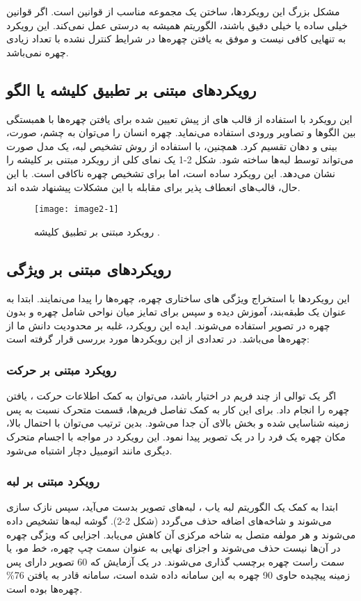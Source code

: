 مشکل بزرگ این رویکرد‌ها، ساختن یک مجموعه مناسب از قوانین است. اگر قوانین خیلی ساده یا خیلی دقیق باشند، الگوریتم همیشه به درستی عمل نمی‌کند. این رویکرد به تنهایی کافی نیست و موفق به یافتن چهره‌ها در شرایط کنترل نشده با تعداد زیادی چهره نمی‌باشد.

\subsection{رویکردهای مبتنی بر تطبیق کلیشه یا الگو}
این رویکرد با استفاده از قالب  ‌های از پیش تعیین شده برای یافتن چهره‌ها با همبستگی بین الگوها و تصاویر ورودی استفاده می‌نماید. چهره انسان را می‌توان به چشم، صورت، بینی و دهان تقسیم کرد. همچنین، با استفاده از روش تشخیص لبه، یک مدل صورت می‌تواند توسط لبه‌ها ساخته شود. شکل 2-1 یک نمای کلی از رویکرد مبتنی بر کلیشه را نشان می‌دهد. این رویکرد ساده است، اما برای تشخیص چهره ناکافی است. با این حال، قالب‌های انعطاف پذیر برای مقابله با این مشکلات پیشنهاد شده اند.


\begin{figure}[h]
\centering
  \texttt{[image: image2-1]}
  \caption{رویکرد مبتنی بر تطبیق کلیشه  \cite{ref1}.}
  \label{image2-1}
\end{figure}

\subsection{رویکردهای مبتنی بر ویژگی}
این رویکردها‌ با استخراج ویژگی  ‌های ساختاری چهره، چهره‌ها را پیدا می‌نمایند. ابتدا به عنوان یک طبقه‌بند، آموزش دیده و سپس برای تمایز میان نواحی شامل چهره و بدون چهره در تصویر استفاده می‌شوند. ایده این رویکرد، غلبه بر محدودیت دانش ما از چهره‌ها می‌باشد. در \cite{HJELMAS2001236} تعدادی از این رویکردها مورد بررسی قرار گرفته است:

\subsubsection{رویکرد مبتنی بر حرکت}
اگر یک توالی از چند فریم در اختیار باشد، می‌توان به کمک اطلاعات حرکت ، یافتن چهره را انجام داد. برای این کار به کمک تفاصل فریم‌ها، قسمت متحرک نسبت به پس زمینه شناسایی شده و بخش بالای آن جدا می‌شود. بدین ترتیب می‌توان با احتمال بالا، مکان چهره یک فرد را در یک تصویر پیدا نمود. این رویکرد در مواجه با اجسام متحرک دیگری مانند اتومبیل دچار اشتباه می‌شود.

\subsubsection{رویکرد مبتنی بر لبه}
ابتدا به کمک یک الگوریتم لبه یاب ، لبه‌های تصویر بدست می‌آید، سپس نازک سازی می‌شوند و شاخه‌های اضافه حذف می‌گردد (شکل 2-2). گوشه لبه‌ها تشخیص داده می‌شوند و هر مولفه متصل  به شاخه مرکزی آن کاهش می‌یابد. اجزایی که ویژگی چهره در آن‌ها نیست حذف می‌شوند و اجزای نهایی به عنوان سمت چپ چهره، خط مو، یا سمت راست چهره برچسب گذاری می‌شوند. در یک آزمایش که 60 تصویر دارای پس زمینه پیچیده حاوی 90 چهره به این سامانه داده شده است، سامانه قادر به یافتن 76\% چهره‌ها بوده است.

